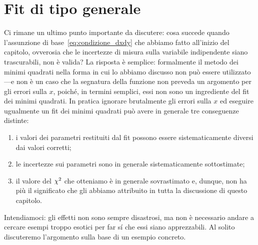 \section{Fit di tipo generale}

Ci rimane un ultimo punto importante da discutere: cosa succede quando
l'assunzione di base~\eqref{eq:condizione_dxdy} che abbiamo fatto all'inizio
del capitolo, ovverosia che le incertezze di misura sulla variabile indipendente
siano trascurabili, non è valida? La risposta è semplice: formalmente il
metodo dei minimi quadrati nella forma in cui lo abbiamo discusso non può
essere utilizzato---e non è un caso che la segnatura della funzione
 non preveda un argomento per gli errori sulla $x$,
poiché, in termini semplici, essi non sono un ingrediente del fit dei minimi
quadrati. In pratica ignorare brutalmente gli errori sulla $x$ ed eseguire
ugualmente un fit dei minimi quadrati può avere in generale tre conseguenze
distinte:
\begin{enumerate}
\item i valori dei parametri restituiti dal fit possono essere
  sistematicamente diversi dai valori corretti;
\item le incertezze sui parametri sono in generale sistematicamente
  sottostimate;
\item il valore del $\chi^2$ che otteniamo è in generale sovrastimato e,
  dunque, non ha più il significato che gli abbiamo attribuito in tutta la
  discussione di questo capitolo.
\end{enumerate}
Intendiamoci: gli effetti non sono sempre disastrosi, ma non è necessario
andare a cercare esempi troppo esotici per far s\'i che essi siano apprezzabili.
Al solito discuteremo l'argomento sulla base di un esempio concreto.


